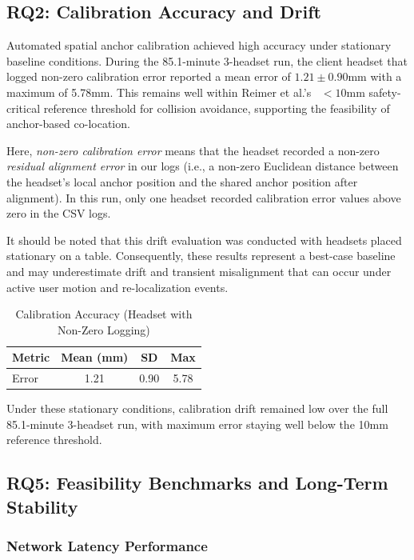 \documentclass[conference]{IEEEtran}
\begin{document}
\subsection{RQ2: Calibration Accuracy and Drift}

Automated spatial anchor calibration achieved high accuracy under stationary baseline conditions. During the 85.1-minute 3-headset run, the client headset that logged non-zero calibration error reported a mean error of $1.21 \pm 0.90$mm with a maximum of 5.78mm. This remains well within Reimer et al.'s~\cite{ReimerDennis2021CfSV} $<10$mm safety-critical reference threshold for collision avoidance, supporting the feasibility of anchor-based co-location.

Here, \emph{non-zero calibration error} means that the headset recorded a non-zero \emph{residual alignment error} in our logs (i.e., a non-zero Euclidean distance between the headset's local anchor position and the shared anchor position after alignment). In this run, only one headset recorded calibration error values above zero in the CSV logs.

It should be noted that this drift evaluation was conducted with headsets placed stationary on a table. Consequently, these results represent a best-case baseline and may underestimate drift and transient misalignment that can occur under active user motion and re-localization events.

\begin{table}[h]
\centering
\caption{Calibration Accuracy (Headset with Non-Zero Logging)}
\begin{tabular}{|l|c|c|c|}
\hline
Metric & \textbf{Mean (mm)} & \textbf{SD} & \textbf{Max} \\
\hline
Error & 1.21 & 0.90 & 5.78 \\
\hline
\end{tabular}
\end{table}

Under these stationary conditions, calibration drift remained low over the full 85.1-minute 3-headset run, with maximum error staying well below the 10mm reference threshold.

\subsection{RQ5: Feasibility Benchmarks and Long-Term Stability}

\subsubsection{Network Latency Performance}
\end{document}
